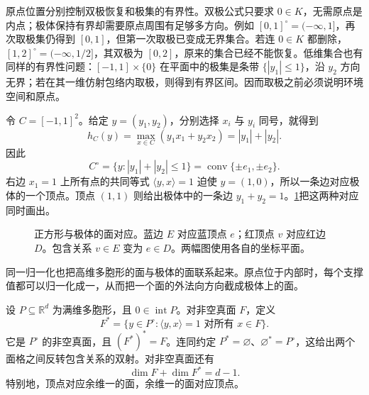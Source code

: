 原点位置分别控制双极恢复和极集的有界性。双极公式只要求 \(0\in K\)，无需原点是内点；极体保持有界却需要原点周围有足够多方向。例如 \([0,1]^\circ=(-\infty,1]\)，再次取极集仍得到 \([0,1]\)，但第一次取极已变成无界集合。若连 \(0\in K\) 都删除，\([1,2]^\circ=(-\infty,1/2]\)，其双极为 \([0,2]\)，原来的集合已经不能恢复。低维集合也有同样的有界性问题：\([-1,1]\times\{0\}\) 在平面中的极集是条带 \(\{|y_1|\le1\}\)，沿 \(y_2\) 方向无界；若在其一维仿射包络内取极，则得到有界区间。因而取极之前必须说明环境空间和原点。

\begin{example}
	\label{g1:exm:square-diamond-polar}
	令 \(C=[-1,1]^2\)。给定 \(y=(y_1,y_2)\)，分别选择 \(x_i\) 与 \(y_i\) 同号，就得到
	\[
		h_C(y)=\max_{x\in C}(y_1x_1+y_2x_2)=|y_1|+|y_2|.
	\]
	因此
	\[
		C^\circ=\{y:|y_1|+|y_2|\le1\}=\operatorname{conv}\{\pm e_1,\pm e_2\}.
	\]
	右边 \(x_1=1\) 上所有点的共同等式 \(\langle y,x\rangle=1\) 迫使 \(y=(1,0)\)，所以一条边对应极体的一个顶点。顶点 \((1,1)\) 则给出极体中的一条边 \(y_1+y_2=1\)。\cref{g1:fig:square-polar}把这两种对应同时画出。
\end{example}

\begin{figure}[htbp]
	\centering
	
	\caption[正方形与极体的面对应]{正方形与极体的面对应。蓝边 \(E\) 对应蓝顶点 \(e\)；红顶点 \(v\) 对应红边 \(D\)。包含关系 \(v\in E\) 变为 \(e\in D\)。两幅图使用各自的坐标平面。}
	\label{g1:fig:square-polar}
\end{figure}

同一归一化也把高维多胞形的面与极体的面联系起来。原点位于内部时，每个支撑值都可以归一化成一，从而把一个面的外法向方向截成极体上的面。

\begin{proposition}
	\label{g1:prop:polar-face-duality}
	设 \(P\subseteq\mathbb R^d\) 为满维多胞形，且 \(0\in\operatorname{int}P\)。对非空真面 \(F\)，定义
	\[
		F^*=\{y\in P^\circ:\langle y,x\rangle=1\text{ 对所有 }x\in F\}.
	\]
	它是 \(P^\circ\) 的非空真面，且 \((F^*)^*=F\)。连同约定 \(P^*=\varnothing\)、\(\varnothing^*=P^\circ\)，这给出两个面格之间反转包含关系的双射。对非空真面还有
	\[
		\dim F+\dim F^*=d-1.
	\]
	特别地，顶点对应余维一的面，余维一的面对应顶点。
\end{proposition}

